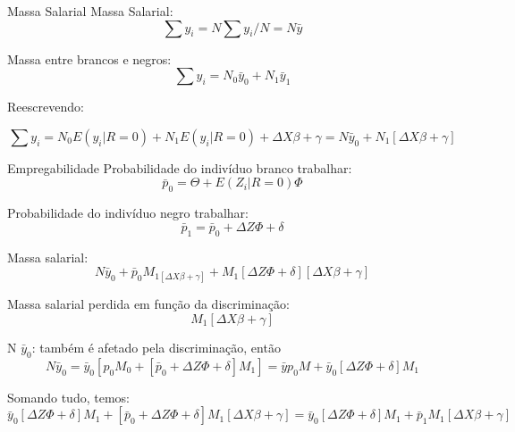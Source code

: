 \documentclass[10pt, xcolor=x11names,compress]{beamer}
\begin{document}
\begin{frame}{Massa Salarial}
	Massa Salarial:
	\begin{equation}
		\sum y_{i} = N \sum y_{i}/N = N \bar{y}
	\end{equation}
	
	Massa entre brancos e negros:
	\begin{equation}
		\sum y_{i} = N_{0} \bar{y}_{0} + N_{1} \bar{y}_{1}
	\end{equation}
	
	Reescrevendo:
	
	\begin{equation}
		\sum y_{i} = N_{0} E(y_{i}|R=0)  + N_{1} E(y_{i}|R=0)  + \Delta X\beta + \gamma =
		N \bar{y}_{0} + N_{1}[\Delta X\beta + \gamma]
	\end{equation}
	
\end{frame}

\begin{frame}{Empregabilidade}
	Probabilidade do indivíduo branco trabalhar:
	\begin{equation}
		\bar{p}_{0}= \Theta + E(Z_{i}|R=0) \Phi
	\end{equation}
	
		Probabilidade do indivíduo negro trabalhar:
	\begin{equation}
		\bar{p}_{1}= \bar{p}_{0} + \Delta Z \Phi + \delta
	\end{equation}
\end{frame}
	
\begin{frame}
	Massa salarial: 
	\begin{equation}
	N\bar{y}_{0} + \bar{p}_{0}M_{1[\Delta X\beta + \gamma ]} + M_{1}[\Delta Z\Phi + \delta][\Delta X\beta + \gamma]
	\end{equation}
	
	Massa salarial perdida em função da discriminação:
	\begin{equation}
		[\bar{p}_{0} + \Delta Z \Phi + \delta] M_{1}[\Delta X\beta + \gamma]
	\end{equation}
	
		N $\bar{y}_{0}$: também é afetado pela discriminação, então
		\begin{equation}
		N\bar{y}_{0} = \bar{y}_{0}[p_{0}M_{0} + [\bar{p}_{0} + \Delta Z\Phi + \delta]M_{1}] = \bar{y}p_{0}M + \bar{y}_{0}[\Delta Z\Phi + \delta]M_1
		\end{equation}
		
	Somando tudo, temos:
	\begin{equation}
	\bar{y}_{0}[\Delta Z\Phi + \delta]M_1 + [\bar{p}_{0} + \Delta Z\Phi + \delta]M_{1}[\Delta X\beta + \gamma] = \bar{y}_{0}[\Delta Z\Phi + \delta]M_1 + \bar{p}_{1}M_{1}[\Delta X\beta + \gamma]
	\end{equation}	
    \end{frame}
\end{document}
